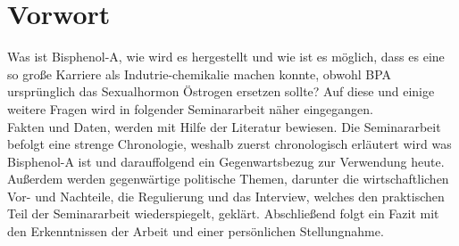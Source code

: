 \section{Vorwort}
Was ist Bisphenol-A, wie wird es hergestellt und wie ist es möglich, dass es eine 
so große Karriere als Indutrie-chemikalie machen konnte, obwohl BPA ursprünglich
das Sexualhormon \glqq Östrogen\grqq{} ersetzen sollte?
Auf diese und einige weitere Fragen wird in folgender Seminararbeit näher eingegangen.
\\Fakten und Daten, werden mit Hilfe der Literatur bewiesen.
Die Seminararbeit befolgt eine strenge Chronologie, weshalb zuerst chronologisch 
erläutert wird was Bisphenol-A ist und darauffolgend ein Gegenwartsbezug zur 
Verwendung heute. Außerdem werden gegenwärtige politische Themen, darunter die wirtschaftlichen
Vor- und Nachteile, die Regulierung und das Interview, welches den praktischen Teil der Seminararbeit
wiederspiegelt, geklärt.
Abschließend folgt ein Fazit mit den Erkenntnissen der Arbeit und einer persönlichen Stellungnahme.

